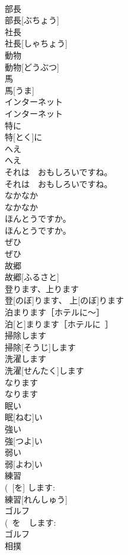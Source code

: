 \documentclass[8pt]{extreport}
\begin{document}
\begin{CJK}{UTF8}{min}
\\	部長	
\\	部長[ぶちょう]	
\\	社長	
\\	社長[しゃちょう]	
\\	動物	
\\	動物[どうぶつ]	
\\	馬	
\\	馬[うま]	
\\	インターネット	
\\	インターネット	
\\	特に	
\\	特[とく]に	
\\	へえ	
\\	へえ	
\\	それは　おもしろいですね。	
\\	それは　おもしろいですね。	
\\	なかなか	
\\	なかなか	
\\	ほんとうですか。	
\\	ほんとうですか。	
\\	ぜひ	
\\	ぜひ	
\\	故郷	
\\	故郷[ふるさと]	
\\	登ります、上ります	
\\	登[のぼ]ります、 上[のぼ]ります	
\\	泊まります［ホテルに～］	
\\	泊[と]まります［ホテルに~］	
\\	掃除します	
\\	掃除[そうじ]します	
\\	洗濯します	
\\	洗濯[せんたく]します	
\\	なります	
\\	なります	
\\	眠い	
\\	眠[ねむ]い	
\\	強い	
\\	強[つよ]い	
\\	弱い	
\\	弱[よわ]い	
\\	練習	
\\	(~[を] します: 
\\	練習[れんしゅう]	
\\	ゴルフ	
\\	(~を　します: 
\\	ゴルフ	
\\	相撲	

\end{CJK}
\end{document}
